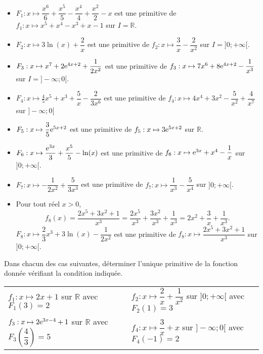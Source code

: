 \documentclass[11pt,fleqn, openany]{book} %
\begin{document}
\begin{solution}\hspace{0pt}

\begin{itemize}\item \(F_1:x\mapsto \dfrac{x^6}{6} + \dfrac{x^5}{5}-\dfrac{x^4}{4}+\dfrac{x^2}{2}-x\) est une primitive de  \(f_1 : x\mapsto x^5 + x^4 - x^3 + x -1\) sur \(I=\mathbb{R}\).
\vskip5pt
\item \(F_2:x\mapsto 3\ln(x) +\dfrac{2}{x}\) est une primitive de \(f_2:x \mapsto \dfrac{3}{x}-\dfrac{2}{x^2}\) sur \(I=]0;+\infty[\).
\vskip5pt
\item \(F_3:x \mapsto x^7 + 2 \mathrm{e}^{4x+2} + \dfrac{1}{2x^2}\) est une primitive de \(f_3:x \mapsto 7x^6+8\mathrm{e}^{4x+2}-\dfrac{1}{x^3}\) sur \(I=]-\infty;0[\).
\vskip5pt
\item  \(F_4:x\mapsto \frac{4}{5}x^5 + x^3 + \dfrac{5}{x} - \dfrac{2}{3x^6}\) est une primitive de \(f_4:x\mapsto 4x^4+3x^2-\dfrac{5}{x^2}+\dfrac{4}{x^7}\) sur \(]-\infty;
0[\)
\vskip5pt
\item \(F_5:x\mapsto \dfrac{3}{5}\mathrm{e}^{5x+2}\) est une primitive de \(f_5:x\mapsto 3\mathrm{e}^{5x+2}\) sur \(\mathbb{R}\).
\vskip5pt
\item \(F_6:x\mapsto \dfrac{\mathrm{e}^{3x}}{3} + \dfrac{x^5}{5} - \ln(x)\) est une primitive de \(f_6:x\mapsto \mathrm{e}^{3x}+x^4-\dfrac{1}{x}\) sur \(]0;+\infty[\).
\vskip5pt
\item \(F_7:x\mapsto -\dfrac{1}{2x^2}+\dfrac{5}{3x^3}\) est une primitive de \(f_7:x \mapsto \dfrac{1}{x^3}-\dfrac{5}{x^4}\) sur \(]0;+\infty[\).
\vskip5pt
\item Pour tout réel \(x>0\), \[f_8(x)=\dfrac{2x^5+3x^2+1}{x^3}=\dfrac{2x^5}{x^3}+\dfrac{3x^2}{x^3}+\dfrac{1}{x^3}=2x^2+\dfrac{3}{x}+\dfrac{1}{x^3}.\]
\(F_8:x\mapsto \dfrac{2}{3}x^3+3\ln (x) - \dfrac{1}{2x^2}\) est une primitive de \(f_8:x\mapsto \dfrac{2x^5+3x^2+1}{x^3}\) sur \(]0;+\infty[\).
\end{itemize}\end{solution}



\begin{exercise}[topic=diff02]Dans chacun des cas suivantes, déterminer l'unique primitive de la fonction donnée vérifiant la condition indiquée.

\renewcommand{\arraystretch}{2}
\begin{tabularx}{\linewidth}{XX}
 $f_1 : x\mapsto 2x+1$ sur $\mathbb{R}$ avec $F_1(3)=2$
&
 $f_2:x \mapsto \dfrac{2}{x}+\dfrac{1}{x^2}$ sur $]0;+\infty[$ avec $F_2(1)=3$
\\
$f_3:x \mapsto 2\mathrm{e}^{3x-4}+1$ sur $\mathbb{R}$ avec $F_3\left(\dfrac{4}{3}\right)=5$
& $f_4 : x \mapsto \dfrac{3}{x}+x$ sur $]-\infty ; 0[$ avec $F_4(-1)=2$
\end{tabularx}

\end{exercise}
\end{document}
